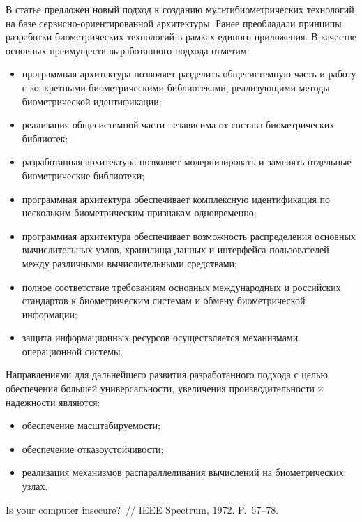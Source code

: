 \begin{multicols}{2}
  В статье предложен новый подход к созданию мультибиометрических 
технологий на базе сервисно-ориентированной архитектуры. Ранее 
преобладали принципы разработки биометрических технологий в рамках 
единого приложения. В качестве основных преимуществ выработанного 
подхода отметим:
  \begin{itemize}
\item программная архитектура позволяет разделить общесистемную 
часть  и работу с конкретными биометрическими библиотеками, 
реализующими методы биометрической идентификации;
\item реализация общесистемной части независима от состава 
биометрических библиотек;
\item разработанная архитектура позволяет модернизировать и заменять 
отдельные биометрические библиотеки;
\item программная архитектура обеспечивает комплексную 
идентификация по нескольким биометрическим признакам 
одновременно;
\item программная архитектура обеспечивает воз\-мож\-ность 
распределения основных вы\-чис\-литель\-ных узлов, хранилища данных и 
интерфейса пользователей между различными %
вычис\-ли\-тель\-ны\-ми  средствами;
\item полное соответствие требованиям основных международных и 
российских стандартов к биометрическим системам и обмену 
биометрической информации;
\item защита информационных ресурсов осуществляется механизмами 
операционной сис\-темы.
\end{itemize}

  Направлениями для дальнейшего развития разработанного подхода с целью 
обеспечения большей универсальности, увеличения производительности и 
надежности являются:
  \begin{itemize}
\item обеспечение масштабируемости;
\item обеспечение отказоустойчивости;
\item реализация механизмов распараллеливания вычислений на 
биометрических узлах.
\end{itemize}
  
{\small\frenchspacing
{%
\begin{thebibliography}{99}
  
Is your computer insecure?~// IEEE Spectrum, 1972. P.~67--78.


\end{thebibliography}}}
\end{multicols}
